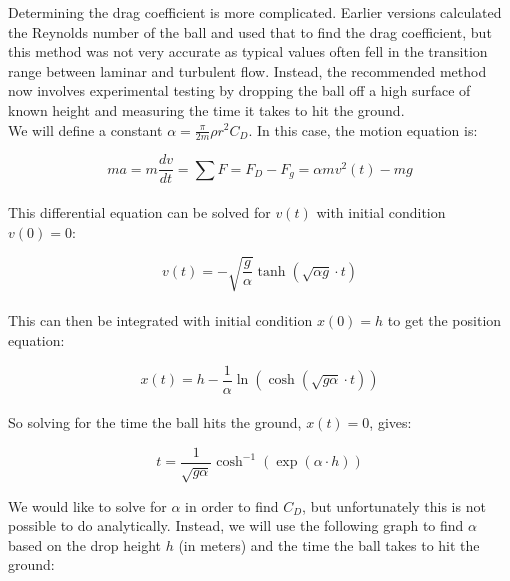 \documentclass[a4paper]{article}
\begin{document}
	Determining the drag coefficient is more complicated. Earlier versions calculated the Reynolds number of the ball and used that to find the drag coefficient, but this method was not very accurate as typical values often fell in the transition range between laminar and turbulent flow. Instead, the recommended method now involves experimental testing by dropping the ball off a high surface of known height and measuring the time it takes to hit the ground.\\
	
	We will define a constant $ \alpha = \frac{\pi}{2 m} \rho r^2 C_D  $. In this case, the motion equation is:
	
	\begin{equation}
		m a = m \frac{dv}{dt} = \sum F = F_D - F_g = \alpha m v^2 (t) - m g
	\end{equation}
	\\
	This differential equation can be solved for $ v(t) $ with initial condition $ v(0) = 0 $:
	
	\begin{equation}
		v(t) = -\sqrt{\frac{g}{\alpha}} \tanh \left( \sqrt{\alpha g} \cdot t \right)
	\end{equation}
	\\
	This can then be integrated with initial condition $ x(0) = h $ to get the position equation:
	
	\begin{equation}
		x(t) = h - \frac{1}{\alpha} \ln \left( \cosh \left( \sqrt{g \alpha} \cdot t \right) \right)
	\end{equation}
	\\
	So solving for the time the ball hits the ground, $ x(t) = 0 $, gives:
	
	\begin{equation}
		t = \frac{1}{\sqrt{g \alpha}} \cosh^{-1} \left( \exp \left( \alpha \cdot h \right) \right)
	\end{equation}
	
	\newpage
	We would like to solve for $ \alpha $ in order to find $ C_D $, but unfortunately this is not possible to do analytically. Instead, we will use the following graph to find $ \alpha $ based on the drop height $ h $ (in meters) and the time the ball takes to hit the ground:
	
\end{document}
